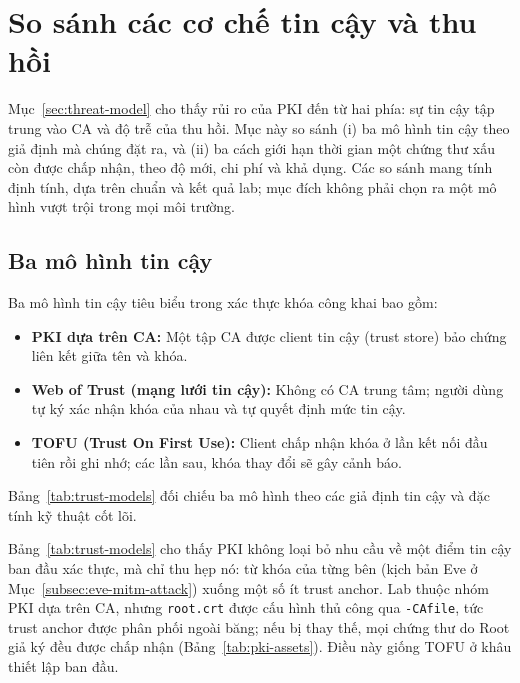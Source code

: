 \section{So sánh các cơ chế tin cậy và thu hồi}
\label{sec:trust-models-comparison}

Mục~\ref{sec:threat-model} cho thấy rủi ro của PKI đến từ hai phía: sự tin cậy tập trung vào CA và độ trễ của thu hồi. Mục này so sánh (i) ba mô hình tin cậy theo giả định mà chúng đặt ra, và (ii) ba cách giới hạn thời gian một chứng thư xấu còn được chấp nhận, theo độ mới, chi phí và khả dụng. Các so sánh mang tính định tính, dựa trên chuẩn và kết quả lab; mục đích không phải chọn ra một mô hình vượt trội trong mọi môi trường.

\subsection{Ba mô hình tin cậy}
\label{subsec:three-trust-models}

Ba mô hình tin cậy tiêu biểu trong xác thực khóa công khai bao gồm:
\begin{itemize}\setlength{\itemsep}{1pt}\setlength{\parskip}{0pt}
    \item \textbf{PKI dựa trên CA:} Một tập CA được client tin cậy (trust store) bảo chứng liên kết giữa tên và khóa.
    \item \textbf{Web of Trust (mạng lưới tin cậy):} Không có CA trung tâm; người dùng tự ký xác nhận khóa của nhau và tự quyết định mức tin cậy.
    \item \textbf{TOFU (Trust On First Use):} Client chấp nhận khóa ở lần kết nối đầu tiên rồi ghi nhớ; các lần sau, khóa thay đổi sẽ gây cảnh báo.
\end{itemize}

Bảng~\ref{tab:trust-models} đối chiếu ba mô hình theo các giả định tin cậy và đặc tính kỹ thuật cốt lõi.



Bảng~\ref{tab:trust-models} cho thấy PKI không loại bỏ nhu cầu về một điểm tin cậy ban đầu xác thực, mà chỉ thu hẹp nó: từ khóa của từng bên (kịch bản Eve ở Mục~\ref{subsec:eve-mitm-attack}) xuống một số ít trust anchor. Lab thuộc nhóm PKI dựa trên CA, nhưng \texttt{root.crt} được cấu hình thủ công qua \texttt{-CAfile}, tức trust anchor được phân phối ngoài băng; nếu bị thay thế, mọi chứng thư do Root giả ký đều được chấp nhận (Bảng~\ref{tab:pki-assets}). Điều này giống TOFU ở khâu thiết lập ban đầu.

